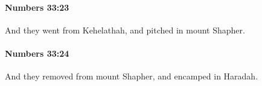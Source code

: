 		\paragraph{Numbers 33:23} %
			\label{NUMBERS-33-23}

			And they went from Kehelathah, and pitched in mount Shapher.


		\paragraph{Numbers 33:24} %
			\label{NUMBERS-33-24}

			And they removed from mount Shapher, and encamped in Haradah.


